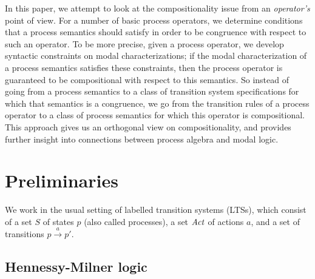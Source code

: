 \documentclass{eptcs}
\def\transa{\stackrel{a}{\rightarrow}}
\def\transa{\stackrel{a}{\rightarrow}}
\begin{document}
In this paper, we attempt to look at the compositionality issue from an \textit{operator's} point of view. For a number of basic process operators, we determine conditions that a process semantics should satisfy in order to be congruence with respect to such an operator. To be more precise, given a process operator, we develop syntactic constraints on modal characterizations; if the modal characterization of a process semantics satisfies these constraints, then the process operator is guaranteed to be compositional with respect to this semantics. So instead of going from a process semantics to a class of transition system specifications for which that semantics is a congruence, we go from the transition rules of a process operator to a class of process semantics for which this operator is compositional. This approach gives us an orthogonal view on compositionality, and provides further insight into connections between process algebra and modal logic.

\section{Preliminaries}

We work in the usual setting of labelled transition systems (LTSs), which consist of a set $S$ of states $p$ (also called processes), a set ${\it Act}$
of actions $a$, and a set of transitions $p \transa p'$.


\subsection{Hennessy-Milner logic}
\label{sec:hml}
\end{document}

